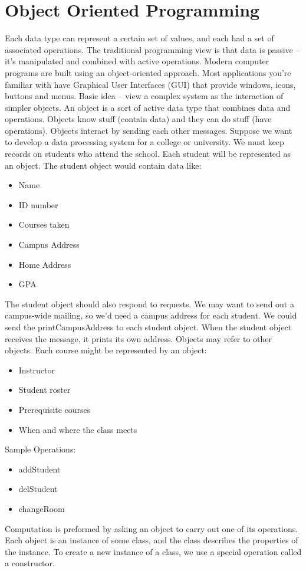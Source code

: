 \documentclass[12pt,a4paper,final,twoside,titlepage]{book}
\begin{document}
\section{Object Oriented Programming}
Each data type can represent a certain set of values, and each had a set of associated operations. The traditional programming view is that data is passive – it’s manipulated and combined with active operations. Modern computer programs are built using an object-oriented approach. Most applications you’re familiar with have Graphical User Interfaces (GUI) that provide windows, icons, buttons and menus. Basic idea – view a complex system as the interaction of simpler objects. An object is a sort of active data type that combines data and operations. Objects know stuff (contain data) and they can do stuff (have operations). Objects interact by sending each other messages.
Suppose we want to develop a data processing system for a college or university. We must keep records on students who attend the school. Each student will be represented as an object. The student object would contain data like:
\begin{itemize}
\item Name
\item ID number
\item Courses taken
\item Campus Address
\item Home Address
\item GPA
\end{itemize}
The student object should also respond to requests. We may want to send out a campus-wide mailing, so we’d need a campus address for each student. We could send the printCampusAddress to each student object. When the student object receives the message, it prints its own address. Objects may refer to other objects. Each course might be represented by an object:
\begin{itemize}
\item Instructor
\item Student roster
\item Prerequisite courses
\item When and where the class meets
\end{itemize}
Sample Operations:
\begin{itemize}
\item addStudent
\item delStudent
\item changeRoom
\end{itemize}
Computation is preformed by asking an object to carry out one of its operations. Each object is an instance of some class, and the class describes the properties of the instance.  To create a new instance of a class, we use a special operation called a constructor.
\end{document}
